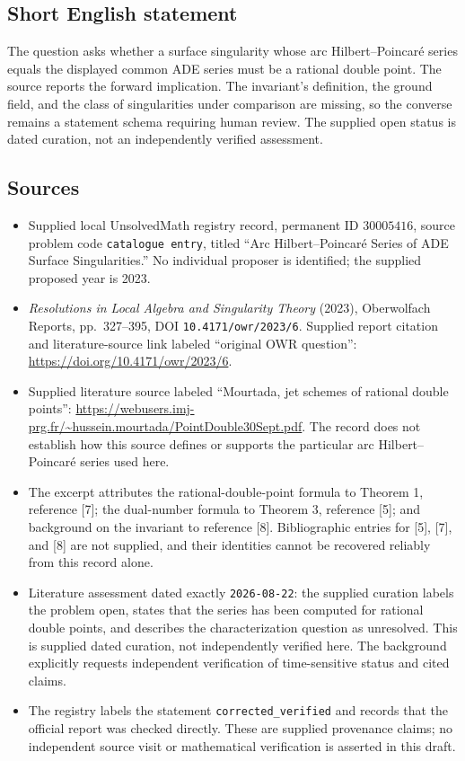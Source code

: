 \documentclass[11pt]{article}
\begin{document}
\subsection{Short English statement}
The question asks whether a surface singularity whose arc Hilbert--Poincar\'e series equals the displayed common ADE series must be a rational double point. The source reports the forward implication. The invariant's definition, the ground field, and the class of singularities under comparison are missing, so the converse remains a statement schema requiring human review. The supplied open status is dated curation, not an independently verified assessment.
\subsection{Sources}
\begin{itemize}
\item Supplied local UnsolvedMath registry record, permanent ID \(30005416\), source problem code \texttt{catalogue entry}, titled ``Arc Hilbert--Poincar\'e Series of ADE Surface Singularities.'' No individual proposer is identified; the supplied proposed year is 2023.
\item \emph{Resolutions in Local Algebra and Singularity Theory} (2023), Oberwolfach Reports, pp.\ 327--395, DOI \texttt{10.4171/owr/2023/6}. Supplied report citation and literature-source link labeled ``original OWR question'': \url{https://doi.org/10.4171/owr/2023/6}.
\item Supplied literature source labeled ``Mourtada, jet schemes of rational double points'': \url{https://webusers.imj-prg.fr/~hussein.mourtada/PointDouble30Sept.pdf}. The record does not establish how this source defines or supports the particular arc Hilbert--Poincar\'e series used here.
\item The excerpt attributes the rational-double-point formula to Theorem 1, reference [7]; the dual-number formula to Theorem 3, reference [5]; and background on the invariant to reference [8]. Bibliographic entries for [5], [7], and [8] are not supplied, and their identities cannot be recovered reliably from this record alone.
\item Literature assessment dated exactly \texttt{2026-08-22}: the supplied curation labels the problem open, states that the series has been computed for rational double points, and describes the characterization question as unresolved. This is supplied dated curation, not independently verified here. The background explicitly requests independent verification of time-sensitive status and cited claims.
\item The registry labels the statement \texttt{corrected\_verified} and records that the official report was checked directly. These are supplied provenance claims; no independent source visit or mathematical verification is asserted in this draft.
\end{itemize}
\end{document}
